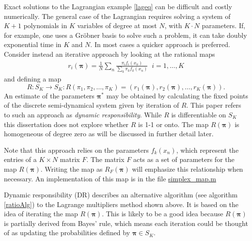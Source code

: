 Exact solutions to the Lagrangian example \ref{lageq} can be difficult and costly numerically.  The general case of the Lagrangian requires solving a system of $K+1$ polynomials in $K$ variables of degree at most $N$, with $K\cdot N$ parameters.  If, for example, one uses a Gr\"obner basis to solve such a problem, it can take doubly exponential time in $K$ and $N$.  In most cases a quicker approach is preferred. \\

Consider instead an iterative approach by looking at the rational maps
\begin{align*}
r_i(\bm\pi)=\frac 1N\sum_n \frac{\pi_i f_i(x_n)}{\sum_{k}\pi_{k}f_{k}(x_n)}\;\; i=1,\ldots,K
\end{align*}
and defining a map 
\begin{equation}\label{map}
R:S_K\rightarrow S_K: R(\pi_1,\pi_2,\ldots,\pi_K)=(r_1(\bm\pi),r_2(\bm\pi),\ldots,r_K(\bm\pi)).
\end{equation}
An estimate of the parameters \( \bm\pi^{\ast} \) may be obtained by calculating the fixed points of the discrete semi-dynamical system given by iteration of \( R \). This paper refers to such an approach as \textit{dynamic responsibility}. While \( R \) is differentiable on \( S_K \) this dissertation does not explore whether \( R \) is 1-1 or onto. The map $R(\bm\pi)$ is homogeneous of degree zero as will be discussed in further detail later.

Note that this approach relies on the parameters $f_k(x_n)$, which represent the entries of a $K\times N$ matrix $F$. The matrix $F$ acts as a set of parameters for the map $R(\bm\pi)$. Writing the map as $R_F(\bm\pi)$ will emphasize this relationship when necessary. An implementation of this map is in the file \url{simplex_map.m}

Dynamic responsibility (DR) describes an alternative algorithm (see algorithm \ref{ratioAlg}) to the Lagrange multipliers method shown above.  It is based on the idea of iterating the map $R(\bm\pi)$. This is likely to be a good idea because $R(\bm\pi)$ is partially derived from Bayes' rule, which means each iteration could be thought of as updating the probabilities defined by $\bm\pi\in S_K$.  

